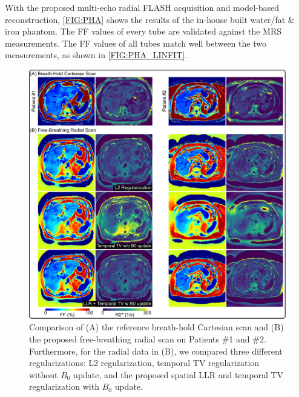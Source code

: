 \documentclass[journal,twoside,web]{ieeecolor}
\begin{document}
With the proposed multi-echo radial FLASH acquisition and 
model-based reconstruction, \cref{FIG:PHA} shows the results 
of the in-house built water/fat \& iron phantom. 
The FF values of every tube are validated against 
the MRS measurements. 
The FF values of all tubes match well between the two measurements, 
as shown in \cref{FIG:PHA_LINFIT}. 


\begin{figure}
	\centering
	\includegraphics[width=\textwidth]{../../figures/tan5.pdf}
	\caption{Comparison of (A) the reference breath-hold Cartesian scan and 
		(B) the proposed free-breathing radial scan on Patients \#1 and \#2. 
		Furthermore, for the radial data in (B), 
		we compared three different regularizations: 
		L2 regularization, 
		temporal TV regularization without $B_0$ update, 
		and the proposed spatial LLR and temporal TV regularization with $B_0$ update.}
	\label{FIG:REGU}
\end{figure}
\end{document}
